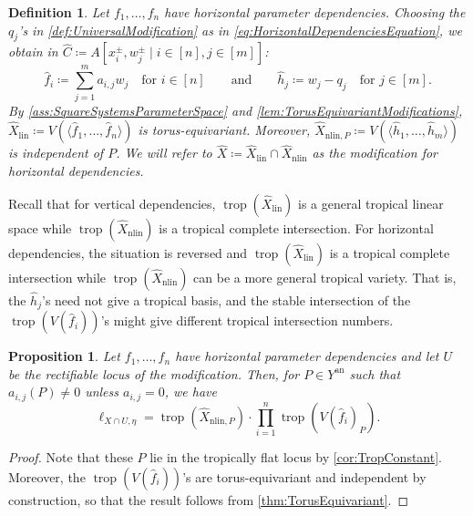 \documentclass[12pt,reqno,a4paper]{amsart}
\theoremstyle{theoremstyle}
\newtheorem{proposition}[theorem]{Proposition}
\theoremstyle{examplestyle}
\newtheorem{definition}[theorem]{Definition}
\theoremstyle{algorithmstyle}
\newcommand{\an}{{\mathrm{an}}}
\newcommand{\lin}{{\mathrm{lin}}}
\newcommand{\nlin}{{\mathrm{nlin}}}
\DeclareMathOperator{\trop}{trop}
\begin{document}
\begin{definition}\label{def:horizontalDependenciesModification}
  Let $f_1,\dots,f_n$ have horizontal parameter dependencies. Choosing the $q_j$'s in \cref{def:UniversalModification} as in \cref{eq:HorizontalDependenciesEquation}, we obtain in $\widehat C \coloneqq A[x_i^\pm, w_{j}^\pm \mid i\in [n], j\in[m]]$:
  \begin{equation*}
    \hat{f}_{i}\coloneqq\sum_{j=1}^m a_{i,j}w_{j} \quad \text{for } i\in[n]\qquad\text{and}\qquad \hat{h}_{j}\coloneqq w_{j}-q_{j} \quad \text{for } j\in[m].
  \end{equation*}
  By \cref{ass:SquareSystemsParameterSpace} and \cref{lem:TorusEquivariantModifications}, $\widehat X_\lin\coloneqq V(\langle \hat f_1,\dots, \hat f_n\rangle)$ is torus-equivariant. Moreover, $\widehat X_{\nlin,P}\coloneqq V(\langle \hat h_1,\dots, \hat h_m\rangle)$ is independent of $P$. We will refer to $\widehat X\coloneqq \widehat X_\lin\cap\widehat X_{\nlin}$ as the \emph{modification} for horizontal dependencies.
\end{definition}

Recall that for vertical dependencies, $\trop(\widehat X_\lin)$ is a general tropical linear space while  $\trop(\widehat X_\nlin)$ is a tropical complete intersection. For horizontal dependencies, the situation is reversed and $\trop(\widehat X_\lin)$ is a tropical complete intersection while $\trop(\widehat X_\nlin)$ can be a more general tropical variety. That is, the $\hat{h}_{j}$'s need not give a tropical basis, and the stable intersection of the $\trop(V(\hat{f}_{i}))$'s might give different tropical intersection numbers.  %

\begin{proposition}\label{prop:horizontalDependenciesRootCount}
  Let $f_1,\dots,f_n$ have horizontal parameter dependencies and let $U$ be the rectifiable locus of the modification. Then, for $P\in Y^\an$ such that %
  $a_{i,j}(P)\neq 0$ unless $a_{i,j}=0$, we have
  \begin{equation*}
    \ell_{X\cap U,\eta} = \trop(\widehat X_{\nlin,P})\cdot \prod_{i=1}^n \trop(V(\widehat{f}_{i})_{P}).
  \end{equation*}
\end{proposition}
\begin{proof}
    Note that these $P$ lie in the tropically flat locus by \cref{cor:TropConstant}. Moreover, the $\trop(V(\widehat{f}_{i}))$'s are torus-equivariant and independent by construction, so that the result follows from \cref{thm:TorusEquivariant}.
\end{proof}
\end{document}
